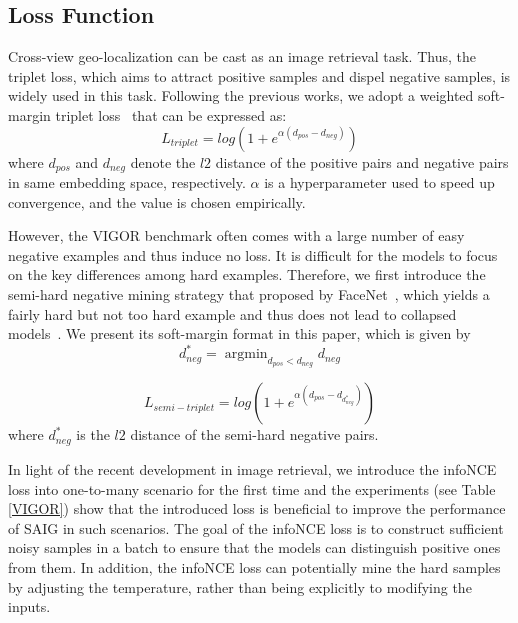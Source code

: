 \documentclass[sn-basic,iicol]{sn-jnl}
\theoremstyle{thmstyletwo}\newtheorem{example}{Example}\newtheorem{remark}{Remark}
\theoremstyle{thmstylethree}\newtheorem{definition}{Definition}
\begin{document}
\subsection{Loss Function}\label{triplet loss}
Cross-view geo-localization can be cast as an image retrieval task. Thus, the triplet loss, which aims to attract positive samples and dispel negative samples, is widely used in this task. Following the previous works, we adopt a weighted soft-margin triplet loss~\citep{hu2018cvm} that can be expressed as:
\begin{equation}
L_{triplet} = log(1+e^{\alpha(d_{pos}-d_{neg})}) \label{loss}
\end{equation}
where $d_{pos}$ and $d_{neg}$ denote the $l2$ distance of the positive pairs and negative pairs in same embedding space, respectively. $\alpha$ is a hyperparameter used to speed up convergence, and the value is chosen empirically.

However, the VIGOR benchmark often comes with a large number of easy negative examples and thus induce no loss. It is difficult for the models to focus on the key differences among hard examples. Therefore, we first introduce the semi-hard negative mining strategy that proposed by FaceNet~\citep{schroff2015facenet}, which yields a fairly hard but not too hard example and thus does not lead to collapsed models~\citep{wu2017sampling}. We present its soft-margin format in this paper, which is given by
\begin{equation}
d^{*}_{neg} = \mathop{\arg\min}_{d_{pos}<d_{neg}} d_{neg} \label{semihardloss}
\end{equation}

\begin{equation}
L_{semi-triplet} = log(1+e^{\alpha(d_{pos}-d_{d^{*}_{neg}})}) \label{semihardloss1}
\end{equation}
where $d^{*}_{neg}$ is the $l2$ distance of the semi-hard negative pairs.





In light of the recent development in image retrieval, we introduce the infoNCE loss into one-to-many scenario for the first time and the experiments (see Table \ref{VIGOR}) show that the introduced loss is beneficial to improve the performance of SAIG in such scenarios.
The goal of the infoNCE loss is to construct sufficient noisy samples in a batch to ensure that the models can distinguish positive ones from them. In addition, the infoNCE loss can potentially mine the hard samples by adjusting the temperature, rather than being explicitly to modifying the inputs. 
\end{document}
